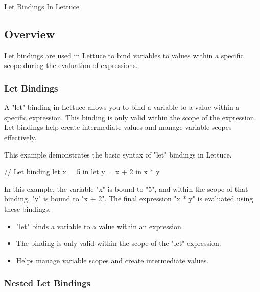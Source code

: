 \begin{notes}{Let Bindings In Lettuce}
    \subsection*{Overview}

    Let bindings are used in Lettuce to bind variables to values within a specific scope during the evaluation of expressions.
    
    \subsubsection*{Let Bindings}
    
    A "let" binding in Lettuce allows you to bind a variable to a value within a specific expression. This binding is only valid within the scope of the expression. Let bindings help create intermediate 
    values and manage variable scopes effectively.
    
    \begin{highlight}
    
        This example demonstrates the basic syntax of "let" bindings in Lettuce.
    
    \begin{code}[Lettuce]
    // Let binding
    let x = 5 in
    let y = x + 2 in
    x * y
    \end{code}
    
        In this example, the variable "x" is bound to "5", and within the scope of that binding, "y" is bound to "x + 2". The final expression "x * y" is evaluated using these bindings.
    
        \begin{itemize}
            \item "let" binds a variable to a value within an expression.
            \item The binding is only valid within the scope of the "let" expression.
            \item Helps manage variable scopes and create intermediate values.
        \end{itemize}
    
    \end{highlight}
    
    \subsubsection*{Nested Let Bindings}
    

\end{notes}
